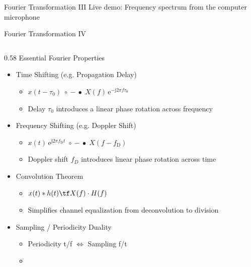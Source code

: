 \begin{frame}{Fourier Transformation III}
    \centering
    Live demo: Frequency spectrum from the computer microphone
\end{frame}

\begin{frame}{Fourier Transformation IV}
    \label{1:FT4}
    \begin{columns}[T,onlytextwidth]
        \begin{column}{0.58\textwidth}
            Essential Fourier Properties\\
            \begin{itemize}
                \item Time Shifting (e.g. Propagation Delay)
                \begin{itemize}
                    \item $x(t - \tau_0) \;\circ\!\!-\!\!\bullet\; X(f) \,\mathrm{e}^{-\mathrm{j} 2\pi f \tau_0}$
                    \item Delay $\tau_0$ introduces a linear phase rotation across frequency
                \end{itemize}
                \item Frequency Shifting (e.g. Doppler Shift)
                \begin{itemize}
                    \item $x(t) \,\mathrm{e}^{\mathrm{j} 2\pi f_\mathrm{D} t} \;\circ\!\!-\!\!\bullet\; X(f - f_\mathrm{D})$
                    \item Doppler shift $f_D$ introduces linear phase rotation across time
                \end{itemize}
                \item Convolution Theorem
                    \begin{itemize}
                        \item $x(t) * h(t) \tf X(f) \cdot H(f)$
                        \item Simplifies channel equalization from deconvolution to division
                    \end{itemize}
                \item Sampling / Periodicity Duality
                \begin{itemize}
                    \item Periodicity t/f $\Longleftrightarrow$ Sampling f/t
                    \item {}
                \end{itemize}
            \end{itemize}
        \end{column}
    

\end{columns}
\end{frame}
